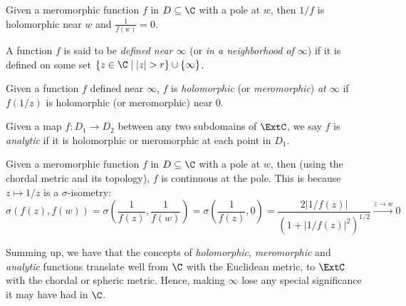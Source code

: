 \begin{remark}
    Given a meromorphic function $f$ in $D \subseteq \C$ with a pole at $w$,
    then $1/f$ is holomorphic near $w$ and $\frac{1}{f(w)} = 0$.
\end{remark}

\begin{definition}
    A function $f$ is said to be \emph{defined near $\infty$} (or \emph{in a
    neighborhood of $\infty$}) if it is defined on some set $\{ z \in \C \mid
    |z| > r \} \cup \{\infty\}$.
\end{definition}

\begin{definition}
    Given a function $f$ defined near $\infty$, $f$ is \emph{holomorphic} (or
    \emph{meromorphic}) \emph{at $\infty$} if $f(1/z)$ is holomorphic (or
    meromorphic) near $0$.
\end{definition}

\begin{definition}
    Given a map $f : D_1 \rightarrow D_2$ between any two subdomains of $\ExtC$,
    we say $f$ is \emph{analytic} if it is holomorphic or meromorphic at each
    point in $D_1$.
\end{definition}

\begin{remark}
    Given a meromorphic function $f$ in $D \subseteq \C$ with a pole at $w$,
    then (using the chordal metric and its topology), $f$ is continuous at the
    pole. This is because $z \mapsto 1/z$ is a $\sigma$-isometry:
    \[
        \sigma(f(z), f(w)) = \sigma\left(\frac{1}{f(z)}, \frac{1}{f(w)}\right) = \sigma\left(\frac{1}{f(z)}, 0\right) = \frac{2|1/f(z)|}{(1+|1/f(z)|^2)^{1/2}} \xrightarrow{z \rightarrow w} 0
    \]
\end{remark}

Summing up, we have that the concepts of \emph{holomorphic}, \emph{meromorphic}
and \emph{analytic} functions translate well from $\C$ with the Euclidean
metric, to $\ExtC$ with the chordal or spheric metric. Hence, making $\infty$
lose any special significance it may have had in $\C$.

